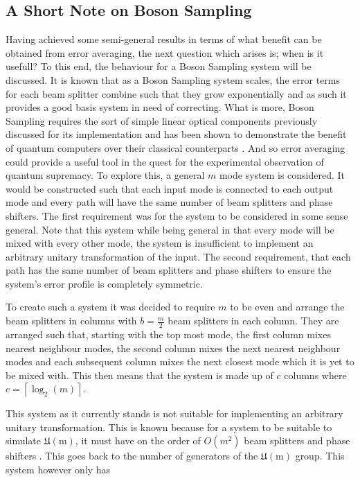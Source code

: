 \documentclass[aps,pra,twocolumn,superscriptaddress,numerical]{revtex4-1}
\begin{document}
	\subsection{A Short Note on Boson Sampling\label{Boson Sampling}}

		Having achieved some semi-general results in terms of what benefit can be obtained from error averaging, the next question which arises is; when is it usefull? To this end, the behaviour for a Boson Sampling system will be discussed. It is known that as a Boson Sampling system scales, the error terms for each beam splitter combine such that they grow exponentially \cite{Boson} and as such it provides a good basis system in need of correcting. What is more, Boson Sampling requires the sort of simple linear optical components previously discussed for its implementation and has been shown to demonstrate the benefit of quantum computers over their classical counterparts \cite{Boson}. And so error averaging could provide a useful tool in the quest for the experimental observation of quantum supremacy. To explore this, a general $m$ mode system is considered. It would be constructed such that each input mode is connected to each output mode and every path will have the same number of beam splitters and phase shifters. The first requirement was for the system to be considered in some sense general. Note that this system while being general in that every mode will be mixed with every other mode, the system is insufficient to implement an arbitrary unitary transformation of the input. The second requirement, that each path has the same number of beam splitters and phase shifters to ensure the system's error profile is completely symmetric.  
				
		To create such a system it was decided to require $m$ to be even and arrange the beam splitters in columns with $b=\frac{m}{2}$ beam splitters in each column. They are arranged such that, starting with the top most mode, the first column mixes nearest neighbour modes, the second column mixes the next nearest neighbour modes and each subsequent column mixes the next closest mode which it is yet to be mixed with. This then means that the system is made up of $c$ columns where $c=\left\lceil \log_{2}(m)\right\rceil $. 
		
		This system as it currently stands is not suitable for implementing an arbitrary unitary transformation. This is known because for a system to be suitable to simulate $\mathfrak{U\mathrm{(m)}}$, it must have on the order of $O\left(m^{2}\right)$ beam splitters and phase shifters \cite{reck}. This goes back to the number of generators of the $\mathfrak{U\mathrm{(m)}}$ group. This system however only has
		
\end{document}
